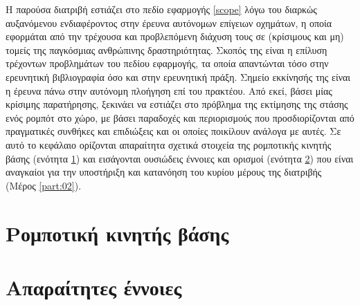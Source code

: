 Η παρούσα διατριβή εστιάζει στο πεδίο εφαρμογής \ref{scope} λόγω του διαρκώς
αυξανόμενου ενδιαφέροντος στην έρευνα αυτόνομων επίγειων οχημάτων, η οποία
εφορμάται από την τρέχουσα και προβλεπόμενη διάχυση τους σε (κρίσιμους και μη)
τομείς της παγκόσμιας ανθρώπινης δραστηριότητας. Σκοπός της είναι η επίλυση
τρέχοντων προβλημάτων του πεδίου εφαρμογής, τα οποία απαντώνται τόσο στην
ερευνητική βιβλιογραφία όσο και στην ερευνητική πράξη. Σημείο εκκίνησής της
είναι η έρευνα πάνω στην αυτόνομη πλοήγηση επί του πρακτέου. Από εκεί, βάσει
μίας κρίσιμης παρατήρησης, ξεκινάει να εστιάζει στο πρόβλημα της εκτίμησης της
στάσης ενός ρομπότ στο χώρο, με βάσει παραδοχές και περιορισμούς που
προσδιορίζονται από πραγματικές συνθήκες και επιδιώξεις και οι οποίες ποικίλουν
ανάλογα με αυτές. Σε αυτό το κεφάλαιο ορίζονται απαραίτητα σχετικά στοιχεία της
ρομποτικής κινητής βάσης (ενότητα \ref{section:01_01_01}) και εισάγονται
ουσιώδεις έννοιες και ορισμοί (ενότητα \ref{section:01_01_02}) που είναι
αναγκαίοι για την υποστήριξη και κατανόηση του κυρίου μέρους της διατριβής
(Μέρος \ref{part:02}).


\section{Ρομποτική κινητής βάσης}
\label{section:01_01_01}


\section{Απαραίτητες έννοιες}
\label{section:01_01_02}

